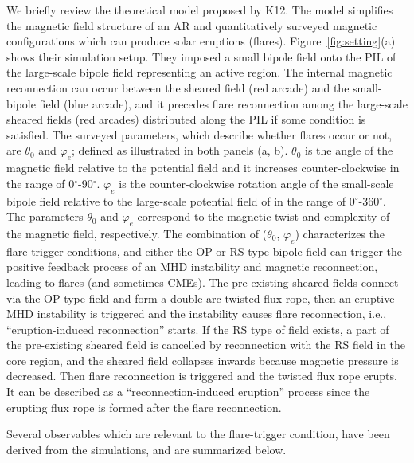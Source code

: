 \documentclass[10pt,preprint2]{aastex}
\begin{document}
We briefly review the theoretical model proposed by K12.
The model simplifies the magnetic field structure of an AR and quantitatively surveyed magnetic configurations which can produce solar eruptions (flares).
Figure~\ref{fig:setting}(a) shows their simulation setup.
They imposed a small bipole field onto the PIL of the large-scale bipole field representing an active region.
The internal magnetic reconnection can occur between the sheared field (red arcade) and the small-bipole field (blue arcade), and it precedes flare reconnection among the large-scale sheared fields (red arcades) distributed along the PIL if some condition is satisfied.
The surveyed parameters, which describe whether flares occur or not, are $\theta_{0}$ and $\varphi_{e}$; defined as illustrated in both panels (a, b).
$\theta_{0}$ is the angle of the magnetic field relative to the potential field and it increases counter-clockwise in the range of 0$^{\circ}$-90$^{\circ}$.
$\varphi_{e}$ is the counter-clockwise rotation angle of the small-scale bipole field relative to the large-scale potential field of in the range of 0$^{\circ}$-360$^{\circ}$.
The parameters $\theta_{0}$ and $\varphi_{e}$ correspond to the magnetic twist and complexity of the magnetic field, respectively.
The combination of ($\theta_{0}$, $\varphi_{e}$) characterizes the flare-trigger conditions, and either the OP or RS type bipole field can trigger the positive feedback process of an MHD instability and magnetic reconnection, leading to flares (and sometimes CMEs).
The pre-existing sheared fields connect via the OP type field and form a double-arc twisted flux rope, then an eruptive MHD instability is triggered and the instability causes flare reconnection, i.e., ``eruption-induced reconnection'' starts.
If the RS type of field exists, a part of the pre-existing sheared field is cancelled by reconnection with the RS field in the core region, and the sheared field collapses inwards because magnetic pressure is decreased.
Then flare reconnection is triggered and the twisted flux rope erupts.
It can be described as a ``reconnection-induced eruption'' process since the erupting flux rope is formed after the flare reconnection.

Several observables which are relevant to the flare-trigger condition, have been derived from the simulations, and are summarized below.
\end{document}
